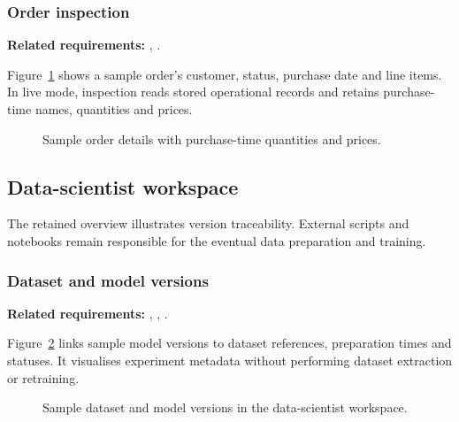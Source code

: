 \begin{samepage}
\subsubsection{Order inspection}
\label{sec:prototype-order-inspection-view}

\textbf{Related requirements:} , .

Figure~\ref{fig:prototype-order-inspection} shows a sample order's customer,
status, purchase date and line items. In live mode, inspection reads stored
operational records and retains purchase-time names, quantities and prices.

\nopagebreak[4]
\begin{figure}[H]
  \centering
  \caption{Sample order details with purchase-time quantities and prices.}
  \label{fig:prototype-order-inspection}
\end{figure}
\end{samepage}

\clearpage
\subsection{Data-scientist workspace}
\label{sec:prototype-scientist}

The retained overview illustrates version traceability. External scripts and
notebooks remain responsible for the eventual data preparation and training.

\begin{samepage}
\subsubsection{Dataset and model versions}
\label{sec:prototype-versions-view}

\textbf{Related requirements:} , , .

Figure~\ref{fig:prototype-data-science} links sample model versions to dataset
references, preparation times and statuses. It visualises experiment metadata
without performing dataset extraction or retraining.

\nopagebreak[4]
\begin{figure}[H]
  \centering
  \caption{Sample dataset and model versions in the data-scientist workspace.}
  \label{fig:prototype-data-science}
\end{figure}
\end{samepage}

